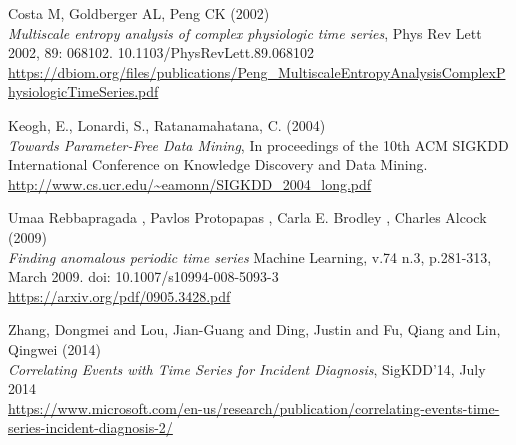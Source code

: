 \documentclass[12pt,a4paper]{article}
\begin{document}
\begin{thebibliography}{9}
Costa M, Goldberger AL, Peng CK (2002)\\
\textit{Multiscale entropy analysis of complex physiologic time series},
Phys Rev Lett 2002, 89: 068102. 10.1103/PhysRevLett.89.068102\\
\url{https://dbiom.org/files/publications/Peng_MultiscaleEntropyAnalysisComplexPhysiologicTimeSeries.pdf}

Keogh, E., Lonardi, S., Ratanamahatana, C. (2004)\\
\textit{Towards Parameter-Free Data Mining},
In proceedings of the 10th ACM SIGKDD International Conference on Knowledge Discovery and Data Mining.\\
\url{http://www.cs.ucr.edu/~eamonn/SIGKDD_2004_long.pdf}

Umaa Rebbapragada , Pavlos Protopapas , Carla E. Brodley , Charles Alcock (2009)\\
\textit{Finding anomalous periodic time series}
Machine Learning, v.74 n.3, p.281-313, March 2009. doi: 10.1007/s10994-008-5093-3\\
\url{https://arxiv.org/pdf/0905.3428.pdf}

Zhang, Dongmei and Lou, Jian-Guang and Ding, Justin and Fu, Qiang and Lin, Qingwei (2014)\\
\textit{Correlating Events with Time Series for Incident Diagnosis},
SigKDD'14, July 2014\\
\url{https://www.microsoft.com/en-us/research/publication/correlating-events-time-series-incident-diagnosis-2/}


\end{thebibliography}



\end{document}

